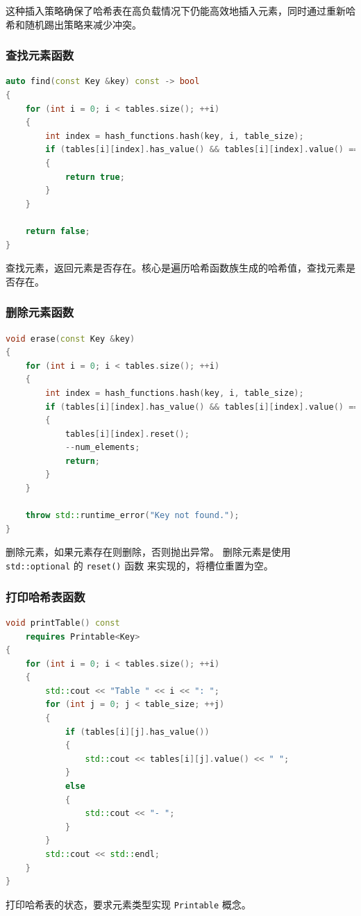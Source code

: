 \documentclass[UTF8]{ctexart}
\begin{document}
这种插入策略确保了哈希表在高负载情况下仍能高效地插入元素，同时通过重新哈希和随机踢出策略来减少冲突。

\subsubsection{查找元素函数}
\begin{lstlisting}[language=C++]
auto find(const Key &key) const -> bool
{
    for (int i = 0; i < tables.size(); ++i)
    {
        int index = hash_functions.hash(key, i, table_size);
        if (tables[i][index].has_value() && tables[i][index].value() == key)
        {
            return true;
        }
    }

    return false;
}
\end{lstlisting}
查找元素，返回元素是否存在。核心是遍历哈希函数族生成的哈希值，查找元素是否存在。

\subsubsection{删除元素函数}
\begin{lstlisting}[language=C++]
void erase(const Key &key)
{
    for (int i = 0; i < tables.size(); ++i)
    {
        int index = hash_functions.hash(key, i, table_size);
        if (tables[i][index].has_value() && tables[i][index].value() == key)
        {
            tables[i][index].reset();
            --num_elements;
            return;
        }
    }

    throw std::runtime_error("Key not found.");
}
\end{lstlisting}
删除元素，如果元素存在则删除，否则抛出异常。
删除元素是使用 \texttt{std::optional} 的 \texttt{reset()} 函数
来实现的，将槽位重置为空。

\subsubsection{打印哈希表函数}
\begin{lstlisting}[language=C++]
void printTable() const
    requires Printable<Key>
{
    for (int i = 0; i < tables.size(); ++i)
    {
        std::cout << "Table " << i << ": ";
        for (int j = 0; j < table_size; ++j)
        {
            if (tables[i][j].has_value())
            {
                std::cout << tables[i][j].value() << " ";
            }
            else
            {
                std::cout << "- ";
            }
        }
        std::cout << std::endl;
    }
}
\end{lstlisting}
打印哈希表的状态，要求元素类型实现 \texttt{Printable} 概念。
\end{document}
